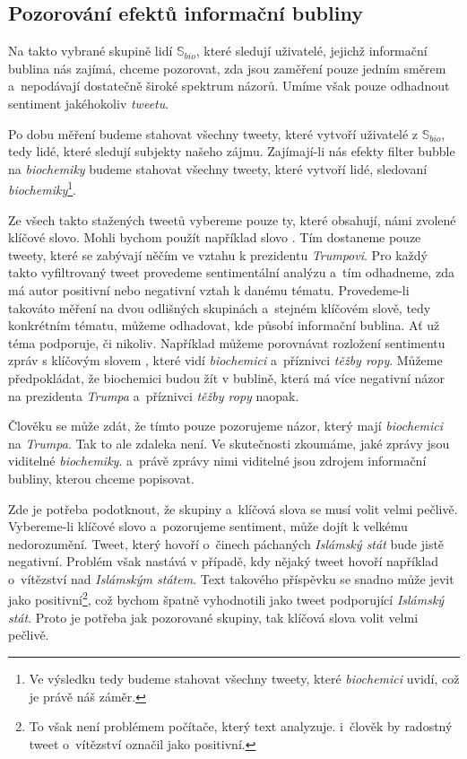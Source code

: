 \documentclass[12pt, a4paper]{article}
\numberwithin{equation}{section} 	%
\begin{document}
\subsection{Pozorování efektů informační bubliny}
\noindent Na takto vybrané skupině lidí $\mathbb{S}_{bio}$, které sledují uživatelé, jejichž informační bublina nás zajímá, chceme pozorovat, zda jsou zaměření pouze jedním směrem a~nepodávají dostatečně široké spektrum názorů. Umíme však pouze odhadnout sentiment jakéhokoliv \textit{tweetu}.

Po dobu měření budeme stahovat všechny tweety, které vytvoří uživatelé z $\mathbb{S}_{bio}$, tedy lidé, které sledují subjekty našeho zájmu. Zajímají-li nás efekty filter bubble na \textit{biochemiky} budeme stahovat všechny tweety, které vytvoří lidé, sledovaní \textit{biochemiky}\footnote{Ve výsledku tedy budeme stahovat všechny tweety, které \textit{biochemici} uvidí, což je právě náš záměr.}.

Ze všech takto stažených tweetů vybereme pouze ty, které obsahují, námi zvolené klíčové slovo. Mohli bychom použít například slovo \textit{}. Tím dostaneme pouze tweety, které se zabývají něčím ve vztahu k prezidentu \textit{Trumpovi}. Pro každý takto vyfiltrovaný tweet provedeme sentimentální analýzu a~tím odhadneme, zda má autor positivní nebo negativní vztah k danému tématu. Provedeme-li takováto měření na dvou odlišných skupinách a~stejném klíčovém slově, tedy konkrétním tématu, můžeme odhadovat, kde působí informační bublina. Ať už téma podporuje, či nikoliv. Například můžeme porovnávat rozložení sentimentu zpráv s klíčovým slovem \textit{}, které vidí \textit{biochemici} a~příznivci \textit{těžby ropy}. Můžeme předpokládat, že biochemici budou žít v bublině, která má více negativní názor na prezidenta \textit{Trumpa} a~příznivci \textit{těžby ropy} naopak.

Člověku se může zdát, že tímto pouze pozorujeme názor, který mají \textit{biochemici} na \textit{Trumpa}. Tak to ale zdaleka není. Ve skutečnosti zkoumáme, jaké zprávy jsou viditelné \textit{biochemiky}. a~právě zprávy nimi viditelné jsou zdrojem informační bubliny, kterou chceme popisovat.

Zde je potřeba podotknout, že skupiny a~klíčová slova se musí volit velmi pečlivě. Vybereme-li klíčové slovo \textit{} a~pozorujeme sentiment, může dojít k velkému nedorozumění. Tweet, který hovoří o~činech páchaných \textit{Islámský stát} bude jistě negativní. Problém však nastává v případě, kdy nějaký tweet hovoří například o~vítězství nad \textit{Islámským státem}. Text takového příspěvku se snadno může jevit jako positivní\footnote{To však není problémem počítače, který text analyzuje. i~člověk by radostný tweet o~vítězství označil jako positivní.}, což bychom špatně vyhodnotili jako tweet podporující \textit{Islámský stát}. Proto je potřeba jak pozorované skupiny, tak klíčová slova volit velmi pečlivě.
\end{document}
